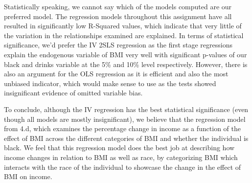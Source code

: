 

Statistically speaking, we cannot say which of the models computed are our preferred model. The regression models throughout this assignment have all resulted in significantly low R-Squared values, which indicate that very little of the variation in the relationships examined are explained. In terms of statistical significance, we'd prefer the IV 2SLS regression as the first stage regressions explain the endogenous variable of BMI very well with significant p-values of our black and drinks variable at the 5\% and 10\% level respectively. However, there is also an argument for the OLS regression as it is efficient and also the most unbiased indicator, which would make sense to use as the tests showed insignificant evidence of omitted variable bias. 

To conclude, although the IV regression has the best statistical significance (even though all models are mostly insignificant), we believe that the regression model from 4.d, which examines the percentage change in income as a function of the effect of BMI across the different categories of BMI and whether the individual is black. We feel that this regression model does the best job at describing how income changes in relation to BMI as well as race, by categorizing BMI which interacts with the race of the individual to showcase the change in the effect of BMI on income.